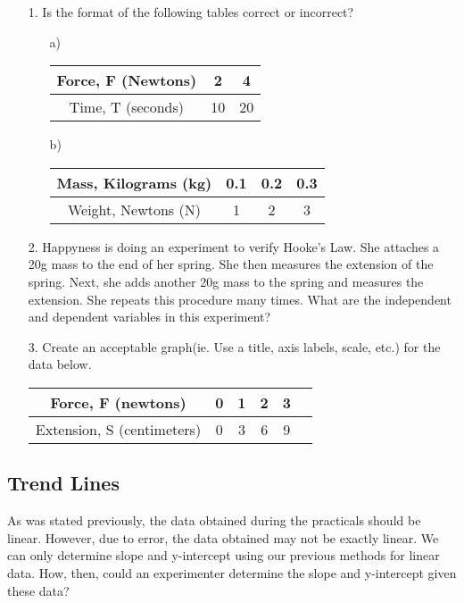 \begin{enumerate}
\item[1.] Is the format of the following tables correct or incorrect?
\begin{enumerate}
\item[a)] 
\begin{tabular}{ | c | c | c |  } \hline
Force, F (Newtons) & 2  & 4 \\ \hline
Time, T (seconds) & 10 & 20 \\ \hline
\end{tabular}

\item[b)]
\begin{tabular}{ | c | c | c | c | } \hline
Mass, Kilograms (kg) & 0.1 & 0.2 & 0.3 \\ \hline
Weight, Newtons (N) & 1 & 2 & 3 \\ \hline
\end{tabular}
\end{enumerate}

\item[2.] Happyness is doing an experiment to verify Hooke's Law. She attaches a 20g mass to the end of her spring. She then measures the extension of the spring. Next, she adds another 20g mass to the spring and measures the extension. She repeats this procedure many times. What are the independent and dependent variables in this experiment?

\item[3.] Create an acceptable graph(ie. Use a title, axis labels, scale, etc.) for the data below.
\begin{center}
\begin{tabular}{ | c | c | c | c | c l } \hline
Force, F (newtons) & 0 & 1 & 2 & 3 \\ \hline
Extension, S (centimeters) & 0 & 3 & 6 & 9 \\ \hline
\end{tabular}
\end{center}
\end{enumerate}

\subsection{Trend Lines}

As was stated previously, the data obtained during the practicals should be linear. However, due to error, the data obtained may not be exactly linear. We can only determine slope and y-intercept using our previous methods for linear data. How, then, could an experimenter determine the slope and y-intercept given these data?

